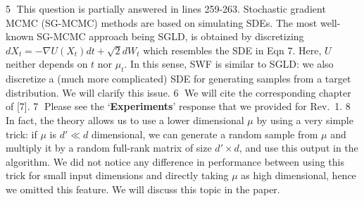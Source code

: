 \documentclass{article}
\newcommand{\rev}[1]{{\color{red} #1}}
\newcommand{\umut}[1]{{\color{blue} #1}}
\newcommand{\antoine}[1]{{\color{orange} #1}}
\newcommand{\ubul}[1]{{\large \color{red} \textcircled{\small #1}}}
\begin{document}
%
\ubul{5} This question is partially answered in lines 259-263. Stochastic gradient MCMC (SG-MCMC) methods are based on simulating SDEs. The most well-known SG-MCMC approach being SGLD, is obtained by discretizing $d X_t = - \nabla U(X_t) dt + \sqrt{2} dW_t$ which resembles the SDE in Eqn 7. Here, $U$ neither depends on $t$ nor $\mu_t$. In this sense, SWF is similar to SGLD: we also discretize a (much more complicated) SDE for generating samples from a target distribution. We will clarify this issue. 
%
%
\ubul{6} We will cite the corresponding chapter of [7]. %
%
%
%
\ubul{7} Please see the `\textbf{Experiments}' response that we provided for Rev.\ 1.  
%
%
\ubul{8} In fact, the theory allows us to use a lower dimensional $\mu$ by using 
a very simple trick: if $\mu$ is $d' \ll d$ dimensional, we can generate a random sample from $\mu$ and multiply it by a random full-rank matrix of size $d' \times d$, and use this output in the algorithm. We did not notice any difference in performance between using this trick for small input dimensions and directly taking $\mu$ as high dimensional, hence we omitted this feature. We will discuss this topic in the paper.
\end{document}
